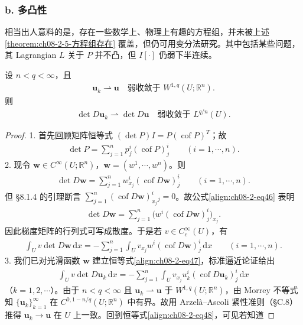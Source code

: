 \documentclass[../../main.tex]{subfiles}
\begin{document}
\subsubsection*{b. 多凸性}

相当出人意料的是，存在一些数学上、物理上有趣的方程组，并未被上述\cref{theorem:ch08-2-5-方程组存在} 覆盖，但仍可用变分法研究。其中包括某些问题，其 Lagrangian $L$ 关于 $P$ 并不凸，但 $I[\cdot]$ 仍弱下半连续。

\begin{lemma}[行列式的弱连续性]\label{lemma:ch08-2-行列式弱连续}
设 $n<q<\infty$，且
\begin{align*}
\mathbf{u}_k\rightharpoonup\mathbf{u}\quad\text{弱收敛于 }W^{1,q}(U;\mathbb{R}^n).
\end{align*}
则
\begin{align*}
\det D\mathbf{u}_k\rightharpoonup\det D\mathbf{u}\quad\text{弱收敛于 }L^{q/n}(U).
\end{align*}
\begin{proof}
1. 首先回顾矩阵恒等式 $(\det P)I=P(\operatorname{cof}P)^T$；故
\begin{align*}
\det P=\sum_{j=1}^n p_j^i(\operatorname{cof}P)_j^i\qquad (i=1,\cdots,n).
\end{align*}
2. 现令 $\mathbf{w}\in C^\infty(U;\mathbb{R}^n)$，$\mathbf{w}=(w^1,\cdots,w^n)$。则
\begin{align}
\det D\mathbf{w}=\sum_{j=1}^n w_{x_j}^i(\operatorname{cof}D\mathbf{w})_j^i\qquad (i=1,\cdots,n).\label{align:ch08-2-eq46}
\end{align}
但 \S8.1.4 的引理断言 $\sum_{j=1}^n(\operatorname{cof}D\mathbf{w})_{x_j}^i{}_j=0$。故公式\eqref{align:ch08-2-eq46} 表明
\begin{align*}
\det D\mathbf{w}=\sum_{j=1}^n\big(w^i(\operatorname{cof}D\mathbf{w})_j^i\big)_{x_j}.
\end{align*}
因此梯度矩阵的行列式可写成散度。于是若 $v\in C_c^\infty(U)$，有
\begin{align}
\int_U v\det D\mathbf{w}\,\mathrm{d}x=-\sum_{j=1}^n\int_U v_{x_j}w^i(\operatorname{cof}D\mathbf{w})_j^i\,\mathrm{d}x\qquad (i=1,\cdots,n).\label{align:ch08-2-eq47}
\end{align}
3. 我们已对光滑函数 $\mathbf{w}$ 建立恒等式\eqref{align:ch08-2-eq47}，标准逼近论证给出
\begin{align}
\int_U v\det D\mathbf{u}_k\,\mathrm{d}x=-\sum_{j=1}^n\int_U v_{x_j}u_k^i(\operatorname{cof}D\mathbf{u}_k)_j^i\,\mathrm{d}x\label{align:ch08-2-eq48}
\end{align}
（$k=1,2,\cdots$）。由于 $n<q<\infty$ 且 $\mathbf{u}_k\rightharpoonup\mathbf{u}$ 于 $W^{1,q}(U;\mathbb{R}^n)$，由 Morrey 不等式知 $\{\mathbf{u}_k\}_{k=1}^\infty$ 在 $C^{0,1-n/q}(U;\mathbb{R}^n)$ 中有界。故用 Arzelà--Ascoli 紧性准则（\S C.8）推得 $\mathbf{u}_k\to\mathbf{u}$ 在 $U$ 上一致。回到恒等式\eqref{align:ch08-2-eq48}，可见若知道

\end{proof}
\end{lemma}
\end{document}
